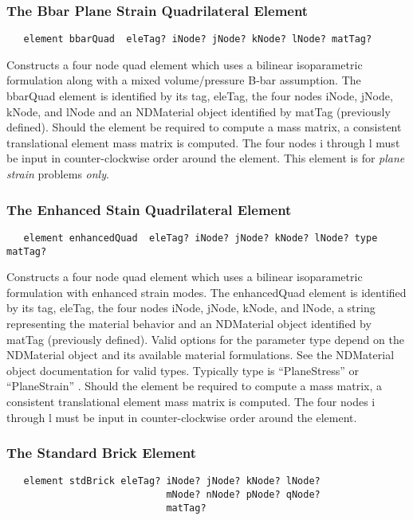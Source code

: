 \documentclass[12pt]{article}
\begin{document}
\subsubsection{The Bbar Plane Strain Quadrilateral Element}
{\sf\small
\begin{verbatim}
   element bbarQuad  eleTag? iNode? jNode? kNode? lNode? matTag? 
\end{verbatim}
}

\noindent Constructs a four node quad
element which uses a bilinear isoparametric formulation along with
a mixed volume/pressure B-bar assumption.
The bbarQuad element is identified by its tag,
eleTag, 
the four nodes iNode, jNode, kNode, and lNode
and an NDMaterial object identified by matTag (previously
defined). 
Should the element be required to compute a mass matrix, a consistent 
translational element mass matrix is computed.
The four nodes i through l must be input in
counter-clockwise order around the element.
This element is for {\em plane strain} problems {\em only}.


\subsubsection{The Enhanced Stain Quadrilateral Element}
{\sf\small
\begin{verbatim}
   element enhancedQuad  eleTag? iNode? jNode? kNode? lNode? type matTag? 
\end{verbatim}
}

\noindent Constructs a four node quad element which uses a bilinear
isoparametric formulation with enhanced strain modes.
The enhancedQuad element is identified by its tag,
eleTag, the four nodes iNode, jNode, kNode, and lNode, 
a string representing the material behavior 
and an NDMaterial object identified by matTag (previously
defined). 
Valid options for the parameter type depend on the
NDMaterial object and its available material formulations. See the
NDMaterial object documentation for valid types. 
Typically type is ``PlaneStress'' or ``PlaneStrain'' .
Should the element be required to compute a mass matrix, a consistent 
translational element mass matrix is computed.
The four nodes i through l must be input in
counter-clockwise order around the element.



\subsubsection{The Standard Brick Element}
{\sf\small
\begin{verbatim}
   element stdBrick eleTag? iNode? jNode? kNode? lNode? 
                            mNode? nNode? pNode? qNode? 
                            matTag? 
\end{verbatim}
}
\end{document}
